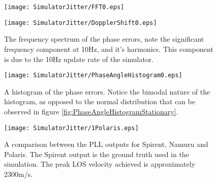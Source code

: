 \begin{figure}[!htb] 
    \centering
    \texttt{[image: SimulatorJitter/FFT0.eps]} 
    \caption{}
    \label{fig:FFT0}
\end{figure}


\begin{figure}[!htb] 
    \centering
    \texttt{[image: SimulatorJitter/DopplerShift0.eps]} 
    \caption{The frequency spectrum of the phase errors, note the significant frequency component at 10Hz, and it's harmonics. This component is due to the 10Hz update rate of the simulator.}
    \label{fig:DopplerShift0}
\end{figure}


\begin{figure}[!htb] 
    \centering
    \texttt{[image: SimulatorJitter/PhaseAngleHistogram0.eps]} 
    \caption{A histogram of the phase errors. Notice the bimodal nature of the histogram, as opposed to the normal distribution that can be observed in figure \ref{fig:PhaseAngleHistogramStationary}.}
    \label{fig:PhaseAngleHistogram0}
\end{figure}

\begin{figure}[!htb] 
    \centering
    \texttt{[image: SimulatorJitter/1Polaris.eps]} 
    \caption{A comparison between the PLL outputs for Spirent, Namuru and Polaris. The Spirent output is the ground truth used in the simulation. The peak \ac{LOS} velocity achieved is approximately 2300m/s.}
    \label{fig:1Polaris}
\end{figure}



